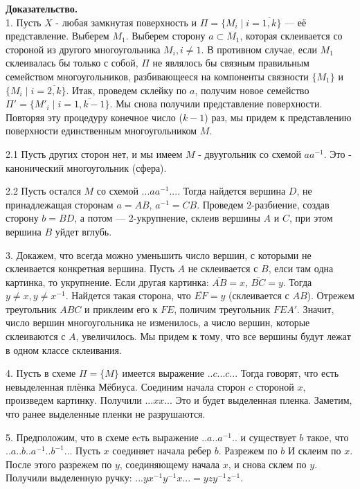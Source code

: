 \documentclass[a4paper]{article}
\begin{document}
\textbf{Доказательство.}\\
1. Пусть $X$ - любая замкнутая поверхность и 
$\Pi=\{M_i\mid i=\overline{1,k}\}$ --- её представление. Выберем $M_1$. 
Выберем сторону $a\subset M_1$, которая склеивается со стороной из
другого многоугольника $M_i,i\ne 1$. В противном случае, если  $M_1$
склеивалась бы только с собой, $\Pi$ не являлось бы связным правильным
семейством многоугольников, разбивающееся на компоненты связности
$\{M_1\}$ и $\{M_i\mid i = \overline{2,k}\}$. Итак, проведем склейку по $a$,
получим новое семейство  $\Pi' = \{M'_i\mid i = \overline{1,k-1}\}$. 
Мы снова получили представление поверхности. Повторяя эту процедуру 
конечное число ($k-1$) раз, мы придем к представлению поверхности
единственным многоугольником $M$.

2.1 Пусть других сторон нет, и мы имеем $M$ - двуугольник со схемой 
$aa^{-1}$. Это - канонический многоугольник (сфера). 

2.2 Пусть остался $M$ со схемой $...aa^{-1}...$. Тогда найдется вершина
$D$, не принадлежащая сторонам $a = AB$,  $a^{-1} = CB$. Проведем 2-разбиение,
создав сторону $b = BD$, а потом --- 2-укрупнение, склеив вершины $A$ и  $C$,
при этом вершина $B$ уйдет вглубь. 

3. Докажем, что всегда можно уменьшить число вершин, с которыми не 
склеивается конкретная вершина. Пусть $A$ не склеивается с $B$, 
елси там одна картинка, то укрупнение.
Если другая картинка:
$\overline{AB} = x$, $\overline{BC}=y$.
Тогда $y\ne x,y\ne x^{-1}$. Найдется такая сторона, что $\overline{EF}=y$
(склеивается с $AB$). Отрежем треугольник $ABC$ и приклеим его к 
$FE$, поличим треугольник $FEA'$. Значит, число вершин многоугольника 
не изменилось, а число вершин, которые склеиваются с  $A$, увеличилось.
Мы придем к тому, что все вершины будут лежат в одном классе склеивания.


4. Пусть в схеме $\Pi = \{M\}$ имеется выражение $..c...c..$. Тогда 
говорят, что есть невыделенная плёнка Мёбиуса. Соединим начала сторон
$c$ стороной $x$, произведем  картинку. 
Получили $...xx..$. Это и будет выделенная пленка. Заметим, что 
ранее выделенные пленки не разрушаются. 

5. Предположим, что в схеме еcть выражение $..a..a^{-1}..$ и 
существует  $b$ такое, что  $..a..b..a^{-1}..b^{-1}..$.
Пусть $x$ соединяет начала ребер $b$. Разрежем по  $b$ И склеим по  $x$. 
После этого разрежем по  $y$, соединяющему начала $x$, и снова склем по 
$y$. Получили выделенную ручку:  $...yx^{-1}y^{-1}x... = yzy^{-1}z^{-1}$. 
\end{document}
